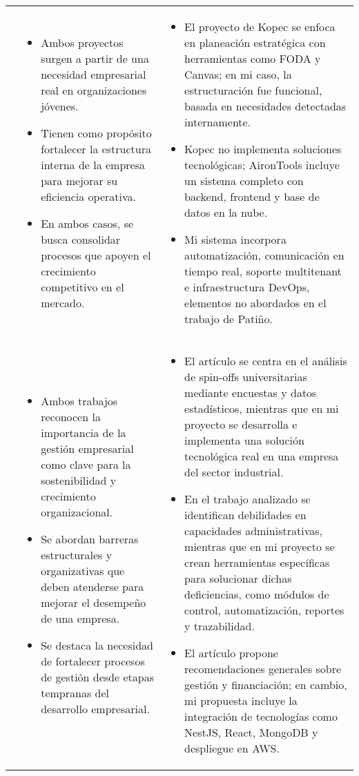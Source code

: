 \begin{longtable}{m{.05\paperwidth} *{2}{m{.33\paperwidth}} @{}}
\cite{Patino19} &
\begin{itemize}
  \item Ambos proyectos surgen a partir de una necesidad empresarial real en organizaciones jóvenes.
  \item Tienen como propósito fortalecer la estructura interna de la empresa para mejorar su eficiencia operativa.
  \item En ambos casos, se busca consolidar procesos que apoyen el crecimiento competitivo en el mercado.
\end{itemize} &
\begin{itemize}
  \item El proyecto de Kopec se enfoca en planeación estratégica con herramientas como FODA y Canvas; en mi caso, la estructuración fue funcional, basada en necesidades detectadas internamente.
  \item Kopec no implementa soluciones tecnológicas; AironTools incluye un sistema completo con backend, frontend y base de datos en la nube.
  \item Mi sistema incorpora automatización, comunicación en tiempo real, soporte multitenant e infraestructura DevOps, elementos no abordados en el trabajo de Patiño.
\end{itemize} \\


\cite{Rodeiro2012} &
\begin{itemize}
  \item Ambos trabajos reconocen la importancia de la gestión empresarial como clave para la sostenibilidad y crecimiento organizacional.
  \item Se abordan barreras estructurales y organizativas que deben atenderse para mejorar el desempeño de una empresa.
  \item Se destaca la necesidad de fortalecer procesos de gestión desde etapas tempranas del desarrollo empresarial.
\end{itemize} &
\begin{itemize}
  \item El artículo se centra en el análisis de spin-offs universitarias mediante encuestas y datos estadísticos, mientras que en mi proyecto se desarrolla e implementa una solución tecnológica real en una empresa del sector industrial.
  \item En el trabajo analizado se identifican debilidades en capacidades administrativas, mientras que en mi proyecto se crean herramientas específicas para solucionar dichas deficiencias, como módulos de control, automatización, reportes y trazabilidad.
  \item El artículo propone recomendaciones generales sobre gestión y financiación; en cambio, mi propuesta incluye la integración de tecnologías como NestJS, React, MongoDB y despliegue en AWS.
\end{itemize} \\


\end{longtable}

